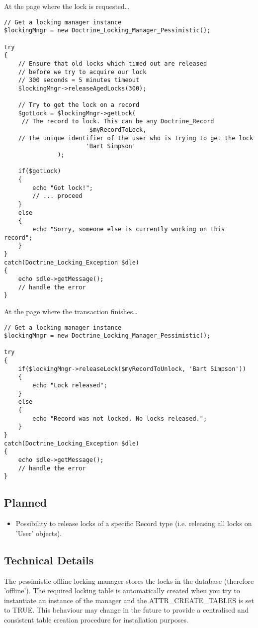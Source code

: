 \documentclass[11pt,a4paper]{report}
\begin{document}
At the page where the lock is requested\ldots

\begin{verbatim}
// Get a locking manager instance
$lockingMngr = new Doctrine_Locking_Manager_Pessimistic();

try
{
    // Ensure that old locks which timed out are released
    // before we try to acquire our lock
    // 300 seconds = 5 minutes timeout
    $lockingMngr->releaseAgedLocks(300);

    // Try to get the lock on a record
    $gotLock = $lockingMngr->getLock(
     // The record to lock. This can be any Doctrine_Record
                        $myRecordToLock,
    // The unique identifier of the user who is trying to get the lock
                       'Bart Simpson'
               );

    if($gotLock)
    {
        echo "Got lock!";
        // ... proceed
    }
    else
    {
        echo "Sorry, someone else is currently working on this record";
    }
}
catch(Doctrine_Locking_Exception $dle)
{
    echo $dle->getMessage();
    // handle the error
}
\end{verbatim}

At the page where the transaction finishes\ldots

\begin{verbatim}
// Get a locking manager instance
$lockingMngr = new Doctrine_Locking_Manager_Pessimistic();

try
{
    if($lockingMngr->releaseLock($myRecordToUnlock, 'Bart Simpson'))
    {
        echo "Lock released";
    }
    else
    {
        echo "Record was not locked. No locks released.";
    }
}
catch(Doctrine_Locking_Exception $dle)
{
    echo $dle->getMessage();
    // handle the error
}
\end{verbatim}

\subsection{Planned}
\begin{itemize}
\item{Possibility to release locks of a specific Record type (i.e. releasing all locks on 'User' objects).}
\end{itemize}
\subsection{Technical Details}
The pessimistic offline locking manager stores the locks in the database (therefore 'offline'). The required locking table is automatically created when you try to instantiate an instance of the manager and the ATTR\_CREATE\_TABLES is set to TRUE. This behaviour may change in the future to provide a centralised and consistent table creation procedure for installation purposes.
\end{document}
